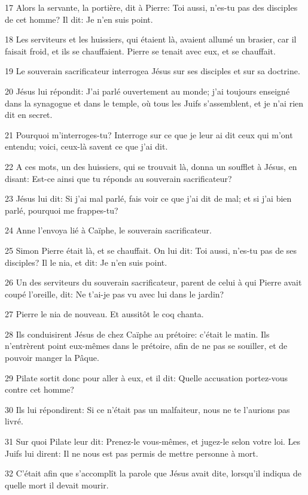 \par 17 Alors la servante, la portière, dit à Pierre: Toi aussi, n'es-tu pas des disciples de cet homme? Il dit: Je n'en suis point.
\par 18 Les serviteurs et les huissiers, qui étaient là, avaient allumé un brasier, car il faisait froid, et ils se chauffaient. Pierre se tenait avec eux, et se chauffait.
\par 19 Le souverain sacrificateur interrogea Jésus sur ses disciples et sur sa doctrine.
\par 20 Jésus lui répondit: J'ai parlé ouvertement au monde; j'ai toujours enseigné dans la synagogue et dans le temple, où tous les Juifs s'assemblent, et je n'ai rien dit en secret.
\par 21 Pourquoi m'interroges-tu? Interroge sur ce que je leur ai dit ceux qui m'ont entendu; voici, ceux-là savent ce que j'ai dit.
\par 22 A ces mots, un des huissiers, qui se trouvait là, donna un soufflet à Jésus, en disant: Est-ce ainsi que tu réponds au souverain sacrificateur?
\par 23 Jésus lui dit: Si j'ai mal parlé, fais voir ce que j'ai dit de mal; et si j'ai bien parlé, pourquoi me frappes-tu?
\par 24 Anne l'envoya lié à Caïphe, le souverain sacrificateur.
\par 25 Simon Pierre était là, et se chauffait. On lui dit: Toi aussi, n'es-tu pas de ses disciples? Il le nia, et dit: Je n'en suis point.
\par 26 Un des serviteurs du souverain sacrificateur, parent de celui à qui Pierre avait coupé l'oreille, dit: Ne t'ai-je pas vu avec lui dans le jardin?
\par 27 Pierre le nia de nouveau. Et aussitôt le coq chanta.
\par 28 Ils conduisirent Jésus de chez Caïphe au prétoire: c'était le matin. Ils n'entrèrent point eux-mêmes dans le prétoire, afin de ne pas se souiller, et de pouvoir manger la Pâque.
\par 29 Pilate sortit donc pour aller à eux, et il dit: Quelle accusation portez-vous contre cet homme?
\par 30 Ils lui répondirent: Si ce n'était pas un malfaiteur, nous ne te l'aurions pas livré.
\par 31 Sur quoi Pilate leur dit: Prenez-le vous-mêmes, et jugez-le selon votre loi. Les Juifs lui dirent: Il ne nous est pas permis de mettre personne à mort.
\par 32 C'était afin que s'accomplît la parole que Jésus avait dite, lorsqu'il indiqua de quelle mort il devait mourir.
